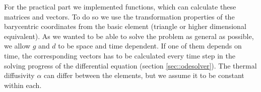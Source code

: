 For the practical part we implemented functions, which can calculate these matrices and vectors. To do so we use the transformation properties of the barycentric coordinates from the basic element (triangle or higher dimensional equivalent). As we wanted to be able to solve the problem as general as possible, we allow $g$ and $d$ to be space and time dependent. If one of them depends on time, the corresponding vectors has to be calculated every time step in the solving progress of the differential equation (section \ref{sec::odesolver}). The thermal diffusivity $\alpha$ can differ between the elements, but we assume it to be constant within each.
